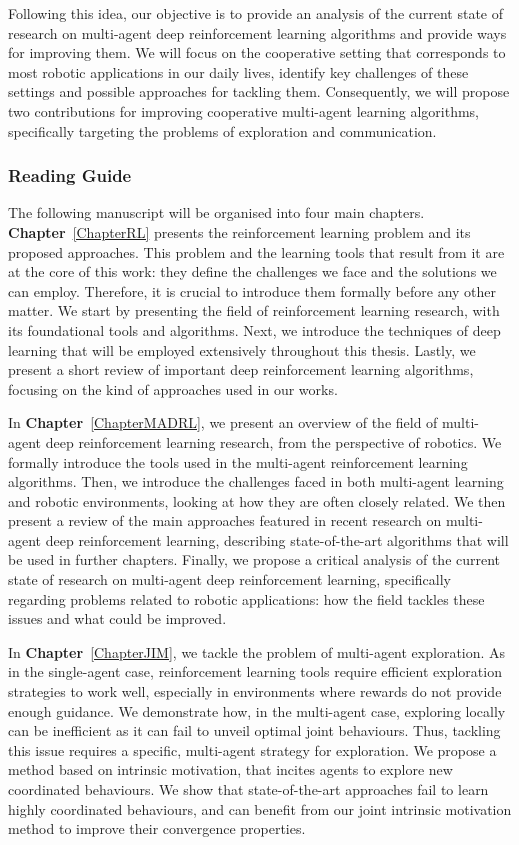 Following this idea, our objective is to provide an analysis of the current state of research on multi-agent deep reinforcement learning algorithms and provide ways for improving them. We will focus on the cooperative setting that corresponds to most robotic applications in our daily lives, identify key challenges of these settings and possible approaches for tackling them. Consequently, we will propose two contributions for improving cooperative multi-agent learning algorithms, specifically targeting the problems of exploration and communication. 


\subsubsection{Reading Guide}

The following manuscript will be organised into four main chapters. \textbf{Chapter}~\ref{ChapterRL} presents the reinforcement learning problem and its proposed approaches. This problem and the learning tools that result from it are at the core of this work: they define the challenges we face and the solutions we can employ. Therefore, it is crucial to introduce them formally before any other matter. We start by presenting the field of reinforcement learning research, with its foundational tools and algorithms. Next, we introduce the techniques of deep learning that will be employed extensively throughout this thesis. Lastly, we present a short review of important deep reinforcement learning algorithms, focusing on the kind of approaches used in our works. 

In \textbf{Chapter}~\ref{ChapterMADRL}, we present an overview of the field of multi-agent deep reinforcement learning research, from the perspective of robotics. We formally introduce the tools used in the multi-agent reinforcement learning algorithms. Then, we introduce the challenges faced in both multi-agent learning and robotic environments, looking at how they are often closely related. We then present a review of the main approaches featured in recent research on multi-agent deep reinforcement learning, describing state-of-the-art algorithms that will be used in further chapters. Finally, we propose a critical analysis of the current state of research on multi-agent deep reinforcement learning, specifically regarding problems related to robotic applications: how the field tackles these issues and what could be improved. 

In \textbf{Chapter}~\ref{ChapterJIM}, we tackle the problem of multi-agent exploration. As in the single-agent case, reinforcement learning tools require efficient exploration strategies to work well, especially in environments where rewards do not provide enough guidance. We demonstrate how, in the multi-agent case, exploring locally can be inefficient as it can fail to unveil optimal joint behaviours. Thus, tackling this issue requires a specific, multi-agent strategy for exploration. We propose a method based on intrinsic motivation, that incites agents to explore new coordinated behaviours. We show that state-of-the-art approaches fail to learn highly coordinated behaviours, and can benefit from our joint intrinsic motivation method to improve their convergence properties. 

